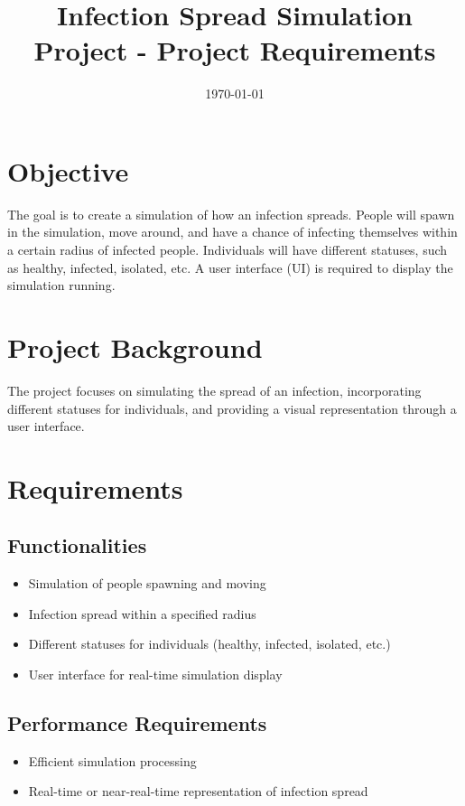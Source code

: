 \documentclass{article}
\begin{document}
	\begin{titlepage}
		\centering
		\title{\textbf{Infection Spread Simulation Project - Project Requirements}}
		\date{\today}
		\maketitle
	\end{titlepage}
	
	\tableofcontents
	\clearpage
	
	\section{Objective}
	The goal is to create a simulation of how an infection spreads. People will spawn in the simulation, move around, and have a chance of infecting themselves within a certain radius of infected people. Individuals will have different statuses, such as healthy, infected, isolated, etc. A user interface (UI) is required to display the simulation running.
	
	\section{Project Background}
	The project focuses on simulating the spread of an infection, incorporating different statuses for individuals, and providing a visual representation through a user interface.
	
	\section{Requirements}
	
	\subsection{Functionalities}
	\begin{itemize}
		\item Simulation of people spawning and moving
		\item Infection spread within a specified radius
		\item Different statuses for individuals (healthy, infected, isolated, etc.)
		\item User interface for real-time simulation display
	\end{itemize}
	
	\subsection{Performance Requirements}
	\begin{itemize}
		\item Efficient simulation processing
		\item Real-time or near-real-time representation of infection spread
	\end{itemize}
	
\end{document}
